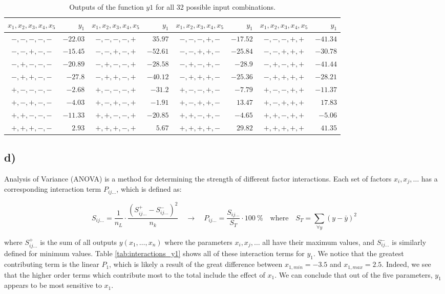 \begin{table}[h!]
\centering
\begin{tabular}{cr|cr|cr|cr}
	$x_1, x_2, x_3, x_4, x_5$ & $y_1$ &$x_1, x_2, x_3, x_4, x_5$ & $y_1$ &$x_1, x_2, x_3, x_4, x_5$ & $y_1$ &$x_1, x_2, x_3, x_4, x_5$ & $y_1$ \\
	\hline
	$-,-,-,-,-$ & $-22.03$ & $-,-,-,-,+$ &  $35.97$ & $-,-,-,+,-$ & $-17.52$ & $-,-,-,+,+$ & $-41.34$ \\
	$-,-,+,-,-$ & $-15.45$ & $-,-,+,-,+$ & $-52.61$ & $-,-,+,+,-$ & $-25.84$ & $-,-,+,+,+$ & $-30.78$ \\
	$-,+,-,-,-$ & $-20.89$ & $-,+,-,-,+$ & $-28.58$ & $-,+,-,+,-$ &  $-28.9$ & $-,+,-,+,+$ & $-41.44$ \\
	$-,+,+,-,-$ &  $-27.8$ & $-,+,+,-,+$ & $-40.12$ & $-,+,+,+,-$ & $-25.36$ & $-,+,+,+,+$ & $-28.21$ \\
	$+,-,-,-,-$ &  $-2.68$ & $+,-,-,-,+$ &  $-31.2$ & $+,-,-,+,-$ &  $-7.79$ & $+,-,-,+,+$ & $-11.37$ \\
	$+,-,+,-,-$ &  $-4.03$ & $+,-,+,-,+$ &  $-1.91$ & $+,-,+,+,-$ &  $13.47$ & $+,-,+,+,+$ &  $17.83$ \\
	$+,+,-,-,-$ & $-11.33$ & $+,+,-,-,+$ & $-20.85$ & $+,+,-,+,-$ &  $-4.65$ & $+,+,-,+,+$ &  $-5.06$ \\
	$+,+,+,-,-$ &   $2.93$ & $+,+,+,-,+$ &   $5.67$ & $+,+,+,+,-$ &  $29.82$ & $+,+,+,+,+$ &  $41.35$ \\
\end{tabular}
\caption{Outputs of the function $y1$ for all 32 possible input combinations.}
\label{tab:outputs_y1}
\end{table}

\subsection*{d)}

Analysis of Variance (ANOVA) is a method for determining the strength of different factor interactions. Each set of factors $x_i, x_j, \dots$ has a corresponding interaction term $P_{ij\dots}$, which is defined as:

\begin{equation}
	S_{ij\dots} = \frac{1}{n_L} \cdot \frac{(S_{ij\dots}^+ - S_{ij\dots}^-)^2}{n_k} \quad\rightarrow\quad P_{ij\dots} = \frac{S_{ij\dots}}{S_T} \cdot 100\ \% \quad \text{where} \quad S_T = \sum_{\forall y} (y - \bar{y})^2
\end{equation}

where $S_{ij\dots}^+$ is the sum of all outputs $y(x_1, \dots, x_n)$ where the parameters $x_i, x_j, \dots$ all have their maximum values, and $S_{ij\dots}^-$ is similarly defined for minimum values. Table \ref{tab:interactions_y1} shows all of these interaction terms for $y_1$. We notice that the greatest contributing term is the linear $P_1$, which is likely a result of the great difference between $x_{1,min} = -3.5$ and $x_{1,max} = 2.5$. Indeed, we see that the higher order terms which contribute most to the total include the effect of $x_1$. We can conclude that out of the five parameters, $y_1$ appears to be most sensitive to $x_1$.

